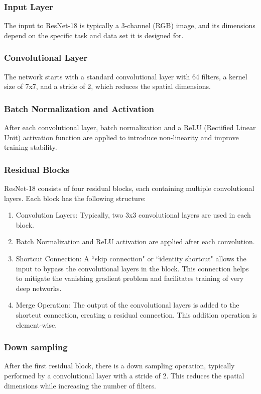 \documentclass[10pt,twocolumn,letterpaper]{article}
\begin{document}
\subsubsection{Input Layer}
The input to ResNet-18 is typically a 3-channel (RGB) image, and its dimensions depend on the specific task and data set it is designed for.

\subsubsection{Convolutional Layer}
The network starts with a standard convolutional layer with 64 filters, a kernel size of 7x7, and a stride of 2, which reduces the spatial dimensions.

\subsubsection{Batch Normalization and Activation}
After each convolutional layer, batch normalization and a ReLU (Rectified Linear Unit) activation function are applied to introduce non-linearity and improve training stability.

\subsubsection{Residual Blocks}
ResNet-18 consists of four residual blocks, each containing multiple convolutional layers. Each block has the following structure:
\begin{enumerate}
    \item Convolution Layers: Typically, two 3x3 convolutional layers are used in each block.
    \item Batch Normalization and ReLU activation are applied after each convolution.
    \item Shortcut Connection: A ``skip connection" or ``identity shortcut" allows the input to bypass the convolutional layers in the block. This connection helps to mitigate the vanishing gradient problem and facilitates training of very deep networks.
    \item Merge Operation: The output of the convolutional layers is added to the shortcut connection, creating a residual connection. This addition operation is element-wise.
\end{enumerate}

\subsubsection{Down sampling}
After the first residual block, there is a down sampling operation, typically performed by a convolutional layer with a stride of 2. This reduces the spatial dimensions while increasing the number of filters.
\end{document}
